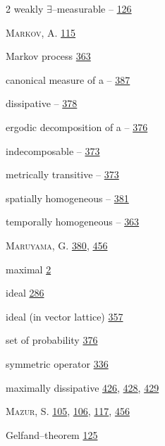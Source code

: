 \begin{multicols}{2}
\hspace*{1.1em}weakly $\exists $--measurable -- \hyperlink{page.126}{126}\par
\noindent \textsc{Markov}, A. \hyperlink{page.115}{115}\par
\noindent Markov process \hyperlink{page.363}{363}\par
\hspace*{1.1em}canonical measure of a -- \hyperlink{page.387}{387}\par
\hspace*{1.1em}dissipative -- \hyperlink{page.378}{378}\par
\hspace*{1.1em}ergodic decomposition of a -- \hyperlink{page.376}{376}\par
\hspace*{1.1em}indecomposable -- \hyperlink{page.373}{373}\par
\hspace*{1.1em}metrically transitive -- \hyperlink{page.373}{373}\par
\hspace*{1.1em}spatially homogeneous -- \hyperlink{page.381}{381}\par
\hspace*{1.1em}temporally homogeneous -- \hyperlink{page.363}{363}\par
\noindent \textsc{Maruyama}, G. \hyperlink{page.380}{380}, \hyperlink{page.456}{456}\par
\noindent maximal \hyperlink{page.2}{2}\par
\hspace*{1.1em}ideal \hyperlink{page.286}{286}\par
\hspace*{1.1em}ideal (in vector lattice) \hyperlink{page.357}{357}\par
\hspace*{1.1em}set of probability \hyperlink{page.376}{376}\par
\hspace*{1.1em}symmetric operator \hyperlink{page.336}{336}\par
\noindent maximally dissipative \hyperlink{page.426}{426}, \hyperlink{page.428}{428}, \hyperlink{page.429}{429}\par
\noindent \textsc{Mazur}, S. \hyperlink{page.105}{105}, \hyperlink{page.106}{106}, \hyperlink{page.117}{117}, \hyperlink{page.456}{456}\par
\hspace*{1.1em}Gelfand--theorem \hyperlink{page.125}{125}\par

\end{multicols}
